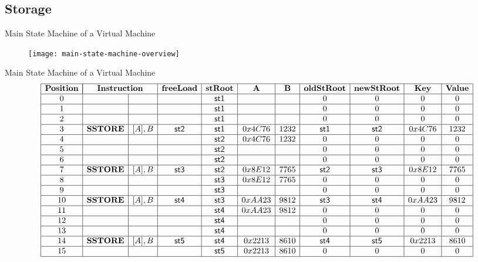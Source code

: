 \subsection{Storage}
\begin{frame}{Main State Machine of a Virtual Machine}
\begin{figure}
	\texttt{[image: main-state-machine-overview]}
\end{figure}
\end{frame}







\begin{frame}{Main State Machine of a Virtual Machine}
\scriptsize
\[
\begin{array}{|c|l|c|c|c|c|c|c|c|c|c|c|}
\hline
\mathbf{Position} & \multicolumn{2}{|c|}{\mathbf{Instruction}} & \mathbf{freeLoad} & \mathbf{stRoot} & \mathbf{A} & \mathbf{B} & \mathbf{oldStRoot} & \mathbf{newStRoot} & \mathbf{Key} & \mathbf{Value} \\ \hline
0 &  &  &  & \mathsf{st1} &  &  & 0 & 0 & 0 & 0 \\ \hline
1 &  &  &  & \mathsf{st1} &  &  & 0 & 0 & 0 & 0 \\ \hline
2 &  &  &  & \mathsf{st1} &  &  & 0 & 0 & 0 & 0 \\ \hline
3 & \mathbf{SSTORE} & [A], B & \mathsf{st2} & \mathsf{st1} & 0x4C76 & 1232 & \mathsf{st1} & \mathsf{st2} & 0x4C76 & 1232 \\ \hline
4 &  &  &  & \mathsf{st2} & 0x4C76 & 1232 & 0 & 0 & 0 & 0 \\ \hline
5 &  &  &  & \mathsf{st2} &  &  & 0 & 0 & 0 & 0 \\ \hline
6 &  &  &  & \mathsf{st2} &  &  & 0 & 0 & 0 & 0 \\ \hline
7 & \mathbf{SSTORE} & [A], B & \mathsf{st3} & \mathsf{st2} & 0x8E12 & 7765 & \mathsf{st2} & \mathsf{st3} & 0x8E12 & 7765 \\ \hline
8 &  &  &  & \mathsf{st3} & 0x8E12 & 7765 & 0 & 0 & 0 & 0 \\ \hline
9 &  &  &  & \mathsf{st3} &  &  & 0 & 0 & 0 & 0 \\ \hline
10 & \mathbf{SSTORE} & [A], B & \mathsf{st4} & \mathsf{st3} & 0xAA23 & 9812 & \mathsf{st3} & \mathsf{st4} & 0xAA23 & 9812 \\ \hline
11 &  &  &  & \mathsf{st4} & 0xAA23 & 9812 & 0 & 0 & 0 & 0 \\ \hline
12 &  &  &  & \mathsf{st4} &  &  & 0 & 0 & 0 & 0 \\ \hline
13 &  &  &  & \mathsf{st4} &  &  & 0 & 0 & 0 & 0 \\ \hline
14 & \mathbf{SSTORE} & [A], B & \mathsf{st5} & \mathsf{st4} & 0x2213 & 8610 & \mathsf{st4} & \mathsf{st5} & 0x2213 & 8610 \\ \hline
15 &  &  &  & \mathsf{st5} & 0x2213 & 8610 & 0 & 0 & 0 & 0 \\ \hline
\end{array}
\]
\end{frame}







